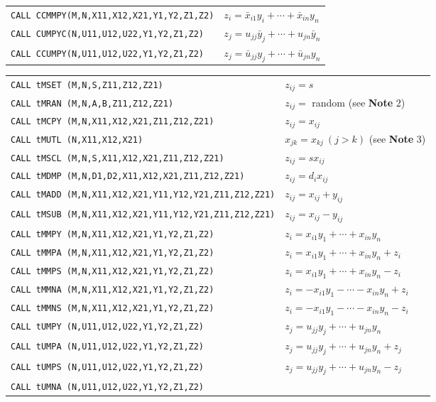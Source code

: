 \begin{flushleft}
\begin{htmlonly}
\begin{tabular}{ll}
{\tt CALL CCMMPY(M,N,X11,X12,X21,Y1,Y2,Z1,Z2)} &
$z_i=\bar{x}_{i1}y_i+\cdots+\bar{x}_{in}y_n$ \\
{\tt CALL CUMPYC(N,U11,U12,U22,Y1,Y2,Z1,Z2)} &
$z_j=u_{jj}\bar{y}_j+\cdots+u_{jn}\bar{y}_n$ \\
{\tt CALL CCUMPY(N,U11,U12,U22,Y1,Y2,Z1,Z2)} &
$z_j=\bar{u}_{jj}y_j+\cdots+\bar{u}_{jn}y_n$ \\
\end{tabular}
\end{htmlonly}
\begin{tabular}{@{}l@{\qquad}l@{}}
{\tt CALL tMSET (M,N,S,Z11,Z12,Z21)} & $z_{ij}=s$ \\
{\tt CALL tMRAN (M,N,A,B,Z11,Z12,Z21)} & $z_{ij} =$ random
(see {\bf Note} 2)\\
{\tt CALL tMCPY (M,N,X11,X12,X21,Z11,Z12,Z21)} & $z_{ij}=x_{ij}$ \\
{\tt CALL tMUTL (N,X11,X12,X21)} &
$x_{jk} = x_{kj} \ (j>k)$ (see {\bf Note} 3) \\
{\tt CALL tMSCL (M,N,S,X11,X12,X21,Z11,Z12,Z21)} & $z_{ij}=sx_{ij}$ \\
{\tt CALL tMDMP (M,N,D1,D2,X11,X12,X21,Z11,Z12,Z21)} &
$z_{ij}=d_ix_{ij}$ \\
{\tt CALL tMADD (M,N,X11,X12,X21,Y11,Y12,Y21,Z11,Z12,Z21)} &
$z_{ij}=x_{ij}+y_{ij}$ \\
{\tt CALL tMSUB (M,N,X11,X12,X21,Y11,Y12,Y21,Z11,Z12,Z21)} &
$z_{ij}=x_{ij}-y_{ij}$ \\
{\tt CALL tMMPY (M,N,X11,X12,X21,Y1,Y2,Z1,Z2)} &
$z_i=x_{i1}y_1+\cdots+x_{in}y_n$ \\
{\tt CALL tMMPA (M,N,X11,X12,X21,Y1,Y2,Z1,Z2)} &
$z_i=x_{i1}y_1+\cdots+x_{in}y_n+z_i$ \\
{\tt CALL tMMPS (M,N,X11,X12,X21,Y1,Y2,Z1,Z2)} &
$z_i=x_{i1}y_1+\cdots+x_{in}y_n-z_i$ \\
{\tt CALL tMMNA (M,N,X11,X12,X21,Y1,Y2,Z1,Z2)} &
$z_i=-x_{i1}y_1-\cdots-x_{in}y_n+z_i$ \\
{\tt CALL tMMNS (M,N,X11,X12,X21,Y1,Y2,Z1,Z2)} &
$z_i=-x_{i1}y_1-\cdots-x_{in}y_n-z_i$ \\
{\tt CALL tUMPY (N,U11,U12,U22,Y1,Y2,Z1,Z2)} &
$z_j=u_{jj}y_j+\cdots+u_{jn}y_n$ \\
{\tt CALL tUMPA (N,U11,U12,U22,Y1,Y2,Z1,Z2)} &
$z_j=u_{jj}y_j+\cdots+u_{jn}y_n+z_j$ \\
{\tt CALL tUMPS (N,U11,U12,U22,Y1,Y2,Z1,Z2)} &
$z_j=u_{jj}y_j+\cdots+u_{jn}y_n-z_j$ \\
{\tt CALL tUMNA (N,U11,U12,U22,Y1,Y2,Z1,Z2)} &

\end{tabular}
\end{flushleft}
